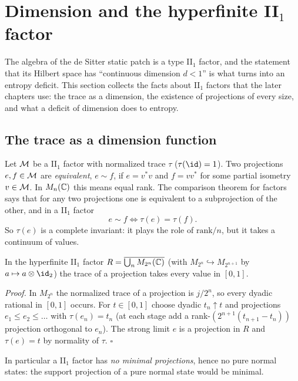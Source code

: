 \section{Dimension and the hyperfinite II$_1$ factor}\label{ch:dimension}
\begin{physmotiv}
The algebra of the de Sitter static patch is a type II$_1$ factor, and the statement that its Hilbert space has ``continuous dimension $d<1$'' is what turns into an entropy deficit. This section collects the facts about II$_1$ factors that the later chapters use: the trace as a dimension, the existence of projections of every size, and what a deficit of dimension does to entropy.
\end{physmotiv}

\subsection{The trace as a dimension function}
Let $\mathcal{M}$ be a II$_1$ factor with normalized trace $\tau$ ($\tau(\id)=1$). Two projections $e,f\in\mathcal{M}$ are \emph{equivalent}, $e\sim f$, if $e=v^*v$ and $f=vv^*$ for some partial isometry $v\in\mathcal{M}$. In $M_n(\mathbb{C})$ this means equal rank. The comparison theorem for factors says that for any two projections one is equivalent to a subprojection of the other, and in a II$_1$ factor
\begin{equation}
e\sim f\iff\tau(e)=\tau(f).
\end{equation}
So $\tau(e)$ is a complete invariant: it plays the role of $\mathrm{rank}/n$, but it takes a continuum of values.

\begin{proposition}
In the hyperfinite II$_1$ factor $R=\overline{\bigcup_nM_{2^n}(\mathbb{C})}$ (with $M_{2^n}\hookrightarrow M_{2^{n+1}}$ by $a\mapsto a\otimes\id_2$) the trace of a projection takes every value in $[0,1]$.
\end{proposition}
\emph{Proof.} In $M_{2^n}$ the normalized trace of a projection is $j/2^n$, so every dyadic rational in $[0,1]$ occurs. For $t\in[0,1]$ choose dyadic $t_n\uparrow t$ and projections $e_1\le e_2\le\dots$ with $\tau(e_n)=t_n$ (at each stage add a rank-$(2^{n+1}(t_{n+1}-t_n))$ projection orthogonal to $e_n$). The strong limit $e$ is a projection in $R$ and $\tau(e)=t$ by normality of $\tau$. \hfill$\square$

In particular a II$_1$ factor has \emph{no minimal projections}, hence no pure normal states: the support projection of a pure normal state would be minimal.

